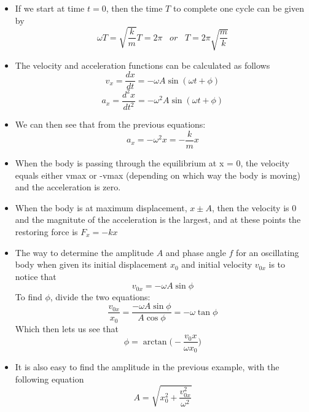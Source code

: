 \documentclass[11pt, a4paper]{article}
\begin{document}
\begin{itemize}
    \item If we start at time $t = 0$, then the time $T$ to complete one cycle can be given by
        \begin{equation}
            \omega{}T = \sqrt{\frac{k}{m}}T = 2\pi \; \; \; or \; \; \; T = 2\pi\sqrt{\frac{m}{k}}
        \end{equation}
    \item The velocity and acceleration functions can be calculated as follows
        \begin{equation}
            v_x = \frac{dx}{dt} = -\omega{}A\sin(\omega{}t + \phi)
        \end{equation}
        \begin{equation}
            a_x = \frac{d^2x}{dt^2} = -\omega^{2}A\sin(\omega{}t + \phi)
        \end{equation}
    \item We can then see that from the previous equations:
        \begin{equation}
            a_x = -\omega^{2}x = -\frac{k}{m}x
        \end{equation}
    \item When the body is passing through the equilibrium at x = 0, the velocity equals either
        vmax or -vmax (depending on which way the body is moving) and the acceleration is zero.
    \item When the body is at maximum displacement, $x \pm A$, then the velocity is 0 and the
        magnitute of the acceleration is the largest, and at these points the restoring force is
        $F_x = -kx$
    \item The way to determine the amplitude $A$ and phase angle $f$ for an oscillating body when
        given its initial displacement $x_0$ and initial velocity $v_{0x}$ is to notice that
        \begin{equation}
            v_{0x} = -\omega{}A\sin\phi
        \end{equation}
        To find $\phi$, divide the two equations:
        \begin{equation}
            \frac{v_{0x}}{x_0} = \frac{-\omega{}A\sin\phi}{A\cos\phi} = -\omega\tan\phi
        \end{equation}
        Which then lets us see that
        \begin{equation}
            \phi = \arctan\bigg(-\frac{v_0x}{\omega{}x_0}\bigg)
        \end{equation}
    \item It is also easy to find the amplitude in the previous example, with the following equation
        \begin{equation}
            A = \sqrt{x_{0}^{2} + \frac{v_{0x}^{2}}{\omega^{2}}}
        \end{equation}
\end{itemize}
\end{document}

